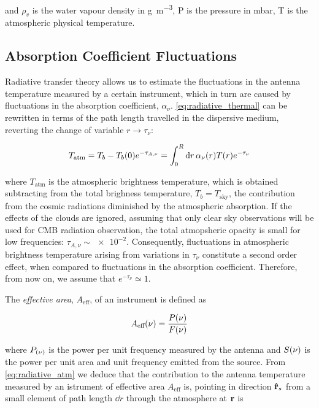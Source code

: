 and $\rho_v$ is the water vapour density in \si{\gram\per\cubic\meter}, P
is the pressure in \si{\milli\bar}, T is the atmospheric physical
temperature.

\subsection{Absorption Coefficient Fluctuations}

Radiative transfer theory allows us to estimate the fluctuations
in the antenna temperature measured by a certain instrument, which in turn
are caused by fluctuations in the absorption coefficient, $\alpha_\nu$.
\autoref{eq:radiative_thermal} can be rewritten in terms of the path length
travelled in the dispersive medium, reverting the change of variable $r
\rightarrow \tau_\nu$:

\begin{equation}
        T_\text{atm} = T_b - T_b\qty(0) e^{-\tau_{A,\nu}} =
        \int^R_0 \dd{r} \alpha_\nu\qty(r) T\qty(r) e^{-\tau_\nu}
        \label{eq:radiative_atm}
\end{equation}

where $T_\text{atm}$ is the atmospheric brightness temperature, which is
obtained subtracting from the total brighness temperature, $T_b =
T_\text{sky}$, the contribution from the cosmic radiations diminished by
the atmospheric absorption. If the effects of the clouds are ignored,
assuming that only clear sky observations will be used for CMB radiation
observation, the total atmopsheric opacity is small for low frequencies:
$\tau_{A,\nu} \sim \num{e-2}$. Consequently, fluctuations in atmospheric
brightness temperature arising from variations in $\tau_\nu$ constitute a
second order effect, when compared to fluctuations in the absorption
coefficient. Therefore, from now on, we assume that $e^{-\tau_\nu} \simeq
1$.

The \emph{effective area}, $A_\text{eff}$, of an instrument is defined as

\begin{equation}
        A_\text{eff}\qty(\nu) = \frac{P\qty(\nu)}{F\qty(\nu)}
\end{equation}

where $P_\qty(\nu)$ is the power per unit frequency measured by the
antenna and $S\qty(\nu)$ is the power per unit area and unit frequency emitted
from the source.
From \autoref{eq:radiative_atm} we deduce that the contribution to the
antenna temperature measured by an istrument of effective area
$A_\text{eff}$ is, pointing in direction $\vectorunit{r}_s$ from a small
element of path length $\dd{r}$ through the atmosphere at $\vb{r}$ is

